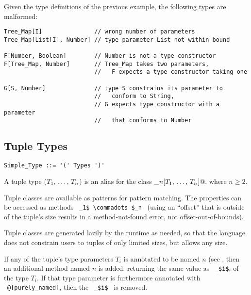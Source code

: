\example
\label{example:parameterized-types-mal}

Given the type definitions of the previous example, the following types are malformed: 

\begin{lstlisting}
Tree_Map[I]               // wrong number of parameters
Tree_Map[List[I], Number] // type parameter List not within bound

F[Number, Boolean]        // Number is not a type constructor
F[Tree_Map, Number]       // Tree_Map takes two parameters, 
                          //   F expects a type constructor taking one

G[S, Number]              // type S constrains its parameter to
                          //   conform to String, 
                          // G expects type constructor with a parameter
                          //   that conforms to Number
\end{lstlisting}





\subsection{Tuple Types}
\label{sec:tuple-types}

\syntax\begin{lstlisting}
Simple_Type ::= '(' Types ')'
\end{lstlisting}

A tuple type ($T_1 ,\, \ldots ,\, T_n$) is an alias for the class \lstinline@Tuple_$n$[$T_1 ,\, \ldots ,\, T_n$]@, where $n \geq 2$. 

Tuple classes are available as patterns for pattern matching. The properties can be accessed as methods ~\lstinline!_1$ \commadots $_n!~ (using an ``offset'' that is outside of the tuple's size results in a method-not-found error, not offset-out-of-bounds). 

Tuple classes are generated lazily by the runtime as needed, so that the language does not constrain users to tuples of only limited sizes, but allows any size. 

If any of the tuple's type parameters $T_i$ is annotated to be named $n$ (see , then an additional method named $n$ is added, returning the same value as ~\lstinline!_$i$!, of the type $T_i$. If that type parameter is furthermore annotated with ~\lstinline!@[purely_named]!, then the ~\lstinline!_$i$!~ is removed. 






